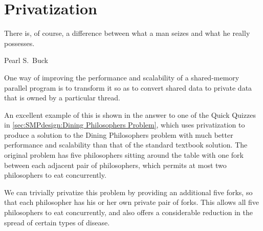 \QuickQuizEnd

\section{Privatization}
\label{sec:owned:Privatization}
%
\epigraph{There is, of course, a difference between what a man seizes
	  and what he really possesses.}
	 {Pearl S.~Buck}

One way of improving the performance and scalability of a shared-memory
parallel program is to transform it so as to convert shared data to
private data that is owned by a particular thread.

An excellent example of this is shown in the answer to one of the
Quick Quizzes in
\cref{sec:SMPdesign:Dining Philosophers Problem},
which uses privatization to produce a solution to the
Dining Philosophers problem with much better performance and scalability
than that of the standard textbook solution.
The original problem has five philosophers sitting around the table
with one fork between each adjacent pair of philosophers, which permits
at most two philosophers to eat concurrently.

We can trivially privatize this problem by providing an additional five
forks, so that each philosopher has his or her own private pair of forks.
This allows all five philosophers to eat concurrently, and also offers
a considerable reduction in the spread of certain types of disease.

